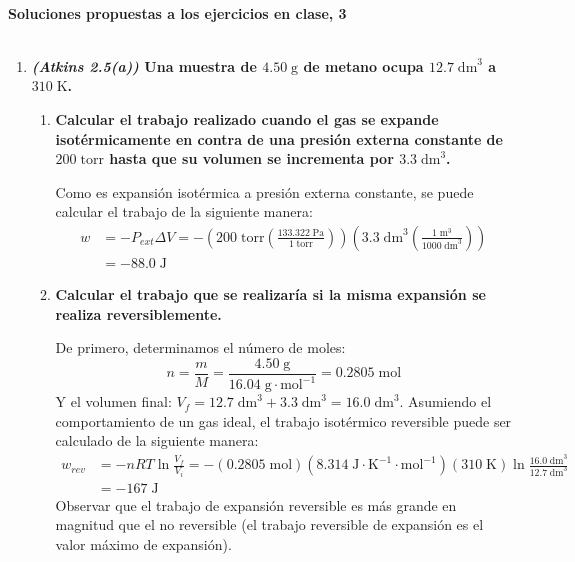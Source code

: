 \documentclass[a4paper,12pt]{article}
\begin{document}

\begin{center}
\HRule \\[0.4cm]
{ \bfseries Soluciones propuestas a los ejercicios en clase, 3}\\ %
\HRule \\[0.4cm]
\end{center}


\begin{enumerate}

 \item \textbf{\textit{(Atkins 2.5(a))} Una muestra de $4.50\;\mbox{g}$ de metano ocupa $12.7\;\mbox{dm}^3$ a $310\;\mbox{K}$.} 
 \begin{enumerate} 
   \item \textbf{Calcular el trabajo realizado cuando el gas se expande isot\'ermicamente en contra de una presi\'on externa constante de $200\;\mbox{torr}$ hasta que su volumen se incrementa por $3.3\;\mbox{dm}^3$.}

Como es expansi\'on isot\'ermica a presi\'on externa constante, se puede calcular el trabajo de la siguiente manera:
\begin{align*}
w& =-P_{ext}\Delta V=-\left(200\;\mbox{torr}\left(\frac{133.322\;\mbox{Pa}}{1\;\mbox{torr}}\right)\right)\left(3.3\;\mbox{dm}^3\left(\frac{1\;\mbox{m}^3}{1000\;\mbox{dm}^3}\right)\right)\\
&=-88.0\;\mbox{J}
\end{align*}

   \item \textbf{Calcular el trabajo que se realizar\'ia si la misma expansi\'on se realiza reversiblemente.}

De primero, determinamos el n\'umero de moles:
$$n=\frac{m}{M}=\frac{4.50\;\mbox{g}}{16.04\;\mbox{g}\cdot\mbox{mol}^{-1}}=0.2805\;\mbox{mol}$$
Y el volumen final: $V_f=12.7\;\mbox{dm}^3+3.3\;\mbox{dm}^3=16.0\;\mbox{dm}^3$.
Asumiendo el comportamiento de un gas ideal, el trabajo isot\'ermico reversible puede ser calculado de la siguiente manera:
\begin{align*}
w_{rev}&=-nRT\ln\frac{V_f}{V_i}=-(0.2805\;\mbox{mol})(8.314\;\mbox{J}\cdot\mbox{K}^{-1}\cdot\mbox{mol}^{-1})(310\;\mbox{K})\ln\frac{16.0\;\mbox{dm}^3}{12.7\;\mbox{dm}^3} \\
&=-167\;\mbox{J}
\end{align*}
Observar que el trabajo de expansi\'on reversible es m\'as grande en magnitud que el no reversible (el trabajo reversible de expansi\'on es el valor m\'aximo de expansi\'on).


\end{enumerate}
\end{enumerate}
\end{document}
